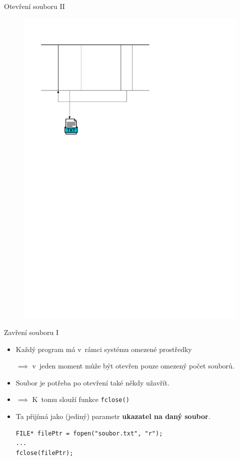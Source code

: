 \documentclass[14pt,aspectratio=169]{beamer}
\begin{document}
    \begin{frame}[t]{Otevření souboru \textrm{II}}
        \begin{figure}
            \centering
            \includegraphics[scale=.7]{images/file_pointer.pdf}
        \end{figure}
    \end{frame}

    \begin{frame}[t,fragile]{Zavření souboru \textrm{I}}
        \begin{itemize}
            \item Každý program má v~rámci systému omezené prostředky
            \begin{center}
                $\implies$ v~jeden moment může být otevřen pouze omezený počet souborů.
            \end{center}
            \item Soubor je potřeba po otevření také někdy užavřít.
            \item $\implies$ K~tomu slouží funkce \texttt{fclose()}
            \item Ta přijímá jako (jediný) parametr \textbf{ukazatel na daný soubor}.
            \begin{lstlisting}
FILE* filePtr = fopen("soubor.txt", "r");
...
fclose(filePtr);
            \end{lstlisting}
        \end{itemize}
    \end{frame}
\end{document}

